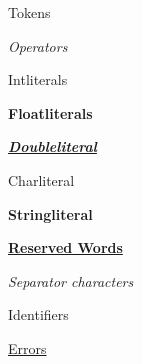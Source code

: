 \documentclass [xcolor=svgnames, t] {beamer}
\begin{document}
\begin{frame}{Tokens}
\begin{itemize}
\color{OrangeRed}
\item \emph{Operators}
\color{purple}
{ \selectfont \item Intliterals}
\color{Turquoise}
{ \selectfont \item \textbf{Floatliterals}}
\color{CadetBlue}
{ \selectfont \item \underline{\emph{\textbf{Doubleliteral}}}}
\color{violet}
{ \selectfont \item Charliteral}
\color{ForestGreen}
{ \selectfont \item \textbf{Stringliteral}}
\color{olive}
\item \underline{\textbf{Reserved Words}}
\color{cyan}
\item \emph{Separator characters}
\color{blue}
\item Identifiers
\color{Pink}
{ \selectfont \item \underline{Errors}}
\end{itemize}
\end{frame}
\end{document}
